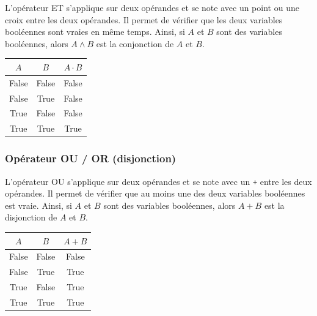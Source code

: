\begin{minipage}{0.80\linewidth}
	L'opérateur ET s'applique sur deux opérandes et se note avec un point ou une croix entre les deux opérandes. Il permet de vérifier que les deux variables booléennes sont vraies en même temps. Ainsi, si $A$ et $B$ sont des variables booléennes, alors $A \wedge B$ est la conjonction de $A$ et $B$.
\end{minipage}\hfill{}
\begin{minipage}{0.18\linewidth}
	\begin{flushright}
		\renewcommand{\arraystretch}{1.2}
	\begin{tabular}{ccc}
		\hline
		$A$ & $B$ & $A \cdot B$ \\
		\hline
		False & False & False \\
		False & True & False \\
		True & False & False \\
		True & True & True \\
		\hline
		
	\end{tabular}
	\end{flushright}
	
\end{minipage}

\subsubsection*{Opérateur OU / OR (disjonction)}

\begin{minipage}{0.80\linewidth}
	L'opérateur OU s'applique sur deux opérandes et se note avec un \verb|+| entre les deux opérandes. Il permet de vérifier que au moins une des deux variables booléennes est vraie. Ainsi, si $A$ et $B$ sont des variables booléennes, alors $A + B$ est la disjonction de $A$ et $B$.
\end{minipage}\hfill{}
\begin{minipage}{0.18\linewidth}
	\begin{flushright}
		\renewcommand{\arraystretch}{1.2}
	\begin{tabular}{ccc}
		\hline
		$A$ & $B$ & $A + B$ \\
		\hline
		False & False & False \\
		False & True & True \\
		True & False & True \\
		True & True & True \\
		\hline
		
	\end{tabular}
	\end{flushright}
	
\end{minipage}

